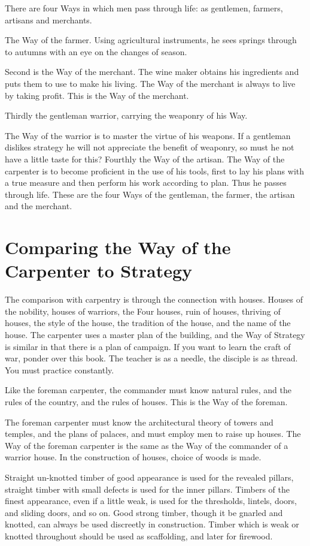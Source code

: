 \documentclass[12pt]{report}
\begin{document}
There are four Ways in which men pass through life: as gentlemen, farmers, artisans and merchants.

The Way of the farmer. Using agricultural instruments, he sees springs through to autumns with an eye on the changes of season.

Second is the Way of the merchant. The wine maker obtains his ingredients and puts them to use to make his living. The Way of the merchant is always to live by taking profit. This is the Way of the merchant.

Thirdly the gentleman warrior, carrying the weaponry of his Way.

The Way of the warrior is to master the virtue of his weapons. If a gentleman dislikes strategy he will not appreciate the benefit of weaponry, so must he not have a little taste for this? Fourthly the Way of the artisan. The Way of the carpenter is to become proficient in the use of his tools, first to lay his plans with a true measure and then perform his work according to plan. Thus he passes through life. These are the four Ways of the gentleman, the farmer, the artisan and the merchant.
\section*{Comparing the Way of the Carpenter to Strategy}
The comparison with carpentry is through the connection with houses. Houses of the nobility, houses of warriors, the Four houses, ruin of houses, thriving of houses, the style of the house, the tradition of the house, and the name of the house. The carpenter uses a master plan of the building, and the Way of Strategy is similar in that there is a plan of campaign. If you want to learn the craft of war, ponder over this book. The teacher is as a needle, the disciple is as thread. You must practice constantly.

Like the foreman carpenter, the commander must know natural rules, and the rules of the country, and the rules of houses. This is the Way of the foreman.

The foreman carpenter must know the architectural theory of towers and temples, and the plans of palaces, and must employ men to raise up houses. The Way of the foreman carpenter is the same as the Way of the commander of a warrior house. In the construction of houses, choice of woods is made.

Straight un-knotted timber of good appearance is used for the revealed pillars, straight timber with small defects is used for the inner pillars. Timbers of the finest appearance, even if a little weak, is used for the thresholds, lintels, doors, and sliding doors, and so on. Good strong timber, though it be gnarled and knotted, can always be used discreetly in construction. Timber which is weak or knotted throughout should be used as scaffolding, and later for firewood.
\end{document}
